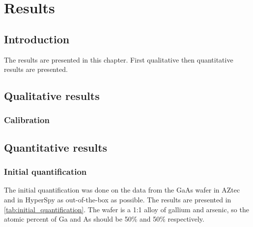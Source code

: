 \chapter{Results}

\section{Introduction}
\label{sec:results:intro}
The results are presented in this chapter.
First qualitative then quantitative results are presented.


\section{Qualitative results}
\label{sec:results:qualitative}


\subsection{Calibration}
\label{sec:results:qualitative:calibration}







\section{Quantitative results}
\label{sec:results:quantification}


\subsection{Initial quantification}
\label{sec:results:initial_quantification}

The initial quantification was done on the data from the GaAs wafer in AZtec and in HyperSpy as out-of-the-box as possible.
The results are presented in \cref{tab:initial_quantification}.
The wafer is a 1:1 alloy of gallium and arsenic, so the atomic percent of Ga and As should be 50\% and 50\% respectively.

